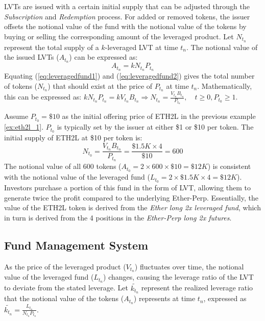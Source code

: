 LVTs are issued with a certain initial supply that can be adjusted through the \textsl{Subscription} and \textsl{Redemption} process. For added or removed tokens, the issuer offsets the notional value of the fund with the notional value of the tokens by buying or selling the corresponding amount of the leveraged product. Let $N_{t_{n}}$ represent the total supply of a $k$-leveraged LVT at time $t_{n}$. The notional value of the issued LVTs ($A_{t_{n}}$) can be expressed as:
\begin{equation}\label{eq:leveragedfund2}
	A_{t_{n}}=kN_{t_{n}}P_{t_{n}}
\end{equation}
Equating (\ref{eq:leveragedfund1}) and (\ref{eq:leveragedfund2}) gives the total number of tokens ($N_{t_{n}}$) that should exist at the price of $P_{t_{n}}$ at time $t_{n}$. Mathematically, this can be expressed as: $kN_{t_{n}}P_{t_{n}}=kV_{t_{n}}B_{t_{n}} \Rightarrow  N_{t_{n}}=\frac{V_{t_{n}}B_{t_{n}}}{P_{t_{n}}},\quad t \ge 0, P_{t_{0}} \ge 1$.

\begin{example}\label{ex:eth2l_2}
	Assume $P_{t_{0}}=\$10$ as the initial offering price of ETH2L in the previous example \ref{ex:eth2l_1}. $P_{t_{0}}$ is typically set by the issuer at either \$1 or \$10 per token. The initial supply of ETH2L at \$10 per token is:
	\begin{equation*}
		N_{t_{0}}=\frac{V_{t_{n}}B_{t_{n}}}{P_{t_{n}}}=\frac{\$1.5K\times{4}}{\$10}=600
	\end{equation*}
	The notional value of all 600 tokens ($A_{t_{0}}=2\times{600}\times{\$10}=\$12K$) is consistent with the notional value of the leveraged fund ($L_{t_{0}}=2\times{\$1.5K}\times{4}=\$12K$). Investors purchase a portion of this fund in the form of LVT, allowing them to generate twice the profit compared to the underlying Ether-Perp. Essentially, the value of the ETH2L token is derived from the \textsl{Ether long 2x leveraged fund}, which in turn is derived from the 4 positions in the \textsl{Ether-Perp long 2x futures}.
\end{example}

\subsection{Fund Management System}\label{subsec:fundmgmt}
As the price of the leveraged product ($V_{t_{n}}$) fluctuates over time, the notional value of the leveraged fund ($L_{t_{n}}$) changes, causing the leverage ratio of the LVT to deviate from the stated leverage. Let $\tilde{k_{t_{n}}}$ represent the realized leverage ratio that the notional value of the tokens ($A_{t_{n}}$) represents at time $t_{n}$, expressed as $\tilde{k_{t_{n}}}=\frac{L_{t_{n}}}{N_{t_{n}}P_{t_{n}}}$.

